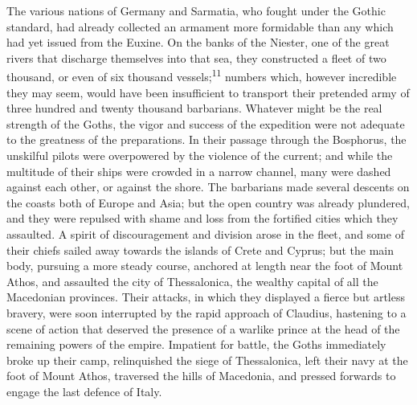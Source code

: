 
The various nations of Germany and Sarmatia, who fought under the
Gothic standard, had already collected an armament more
formidable than any which had yet issued from the Euxine. On the
banks of the Niester, one of the great rivers that discharge
themselves into that sea, they constructed a fleet of two
thousand, or even of six thousand vessels;\textsuperscript{11} numbers which,
however incredible they may seem, would have been insufficient to
transport their pretended army of three hundred and twenty
thousand barbarians. Whatever might be the real strength of the
Goths, the vigor and success of the expedition were not adequate
to the greatness of the preparations. In their passage through
the Bosphorus, the unskilful pilots were overpowered by the
violence of the current; and while the multitude of their ships
were crowded in a narrow channel, many were dashed against each
other, or against the shore. The barbarians made several descents
on the coasts both of Europe and Asia; but the open country was
already plundered, and they were repulsed with shame and loss
from the fortified cities which they assaulted. A spirit of
discouragement and division arose in the fleet, and some of their
chiefs sailed away towards the islands of Crete and Cyprus; but
the main body, pursuing a more steady course, anchored at length
near the foot of Mount Athos, and assaulted the city of
Thessalonica, the wealthy capital of all the Macedonian
provinces. Their attacks, in which they displayed a fierce but
artless bravery, were soon interrupted by the rapid approach of
Claudius, hastening to a scene of action that deserved the
presence of a warlike prince at the head of the remaining powers
of the empire. Impatient for battle, the Goths immediately broke
up their camp, relinquished the siege of Thessalonica, left their
navy at the foot of Mount Athos, traversed the hills of
Macedonia, and pressed forwards to engage the last defence of
Italy.


